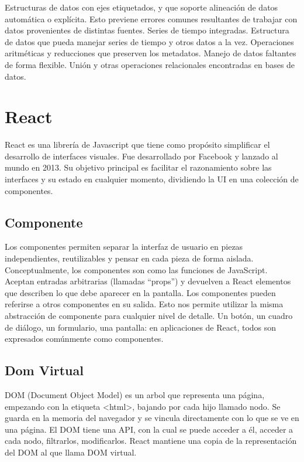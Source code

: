 \begin{outline}
    \1 Estructuras de datos con ejes etiquetados, y que soporte alineación de datos automática o explícita. Esto previene errores comunes resultantes de trabajar con datos provenientes de distintas fuentes.
    \1 Series de tiempo integradas.
    \1 Estructura de datos que pueda manejar series de tiempo y otros datos a la vez.
    \1 Operaciones aritméticas y reducciones que preserven los metadatos.
    \1 Manejo de datos faltantes de forma flexible.
    \1 Unión y otras operaciones relacionales encontradas en bases de datos.
\end{outline}

\section[React]{React}

React es una librería de Javascript que tiene como propósito simplificar el desarrollo de interfaces visuales.
Fue desarrollado por Facebook y lanzado al mundo en 2013.
Su objetivo principal es facilitar el razonamiento sobre las interfaces y su estado en cualquier momento, dividiendo la UI en una colección de componentes.

\subsection[Componente]{Componente}

Los componentes permiten separar la interfaz de usuario en piezas independientes, reutilizables y pensar en cada pieza de forma aislada.
Conceptualmente, los componentes son como las funciones de JavaScript. Aceptan entradas arbitrarias (llamadas “props”) y devuelven a React elementos que describen lo que debe aparecer en la pantalla.
Los componentes pueden referirse a otros componentes en su salida. Esto nos permite utilizar la misma abstracción de componente para cualquier nivel de detalle. Un botón, un cuadro de diálogo, un formulario, una pantalla: en aplicaciones de React, todos son expresados comúnmente como componentes.


\subsection[DOM Virtual]{Dom Virtual}

DOM (Document Object Model) es un arbol que representa una página, empezando con la etiqueta <html>, bajando por cada hijo llamado nodo.
Se guarda en la memoria del navegador y se vincula directamente con lo que se ve en una página. El DOM tiene una API, con la cual se puede acceder a él, acceder a cada nodo, filtrarlos, modificarlos.
React mantiene una copia de la representación del DOM al que llama DOM virtual.

